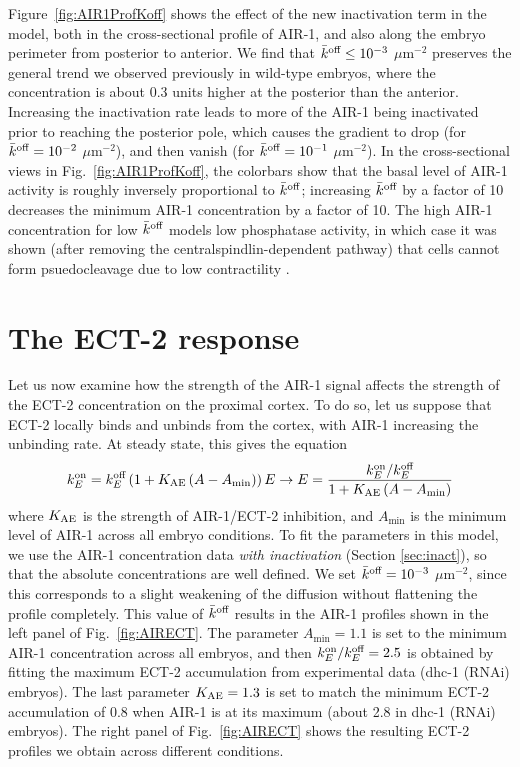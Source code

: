 \documentclass[11pt]{article}
\begin{document}
Figure\ \ref{fig:AIR1ProfKoff} shows the effect of the new inactivation term in the model, both in the cross-sectional profile of AIR-1, and also along the embryo perimeter from posterior to anterior. We find that $\bar{k}^\text{off} \leq 10^{-3}$ $\mu$m$^{-2}$ preserves the general trend we observed previously in wild-type embryos, where the concentration is about 0.3 units higher at the posterior than the anterior. Increasing the inactivation rate leads to more of the AIR-1 being inactivated prior to reaching the posterior pole, which causes the gradient to drop (for $\bar{k}^\text{off}=10^{-2}$ $\mu$m$^{-2}$), and then vanish (for $\bar{k}^\text{off}=10^{-1}$ $\mu$m$^{-2}$). In the cross-sectional views in Fig.\ \ref{fig:AIR1ProfKoff}, the colorbars show that the basal level of AIR-1 activity is roughly inversely proportional to $\bar{k}^\text{off}$; increasing $\bar{k}^\text{off}$ by a factor of 10 decreases the minimum AIR-1 concentration by a factor of 10. The high AIR-1 concentration for low $\bar{k}^\text{off}$ models low phosphatase activity, in which case it was shown (after removing the centralspindlin-dependent pathway) that cells cannot form psuedocleavage due to low contractility \cite{afshar2010regulation, kotak2016aurora}. 

\section{The ECT-2 response}
Let us now examine how the strength of the AIR-1 signal affects the strength of the ECT-2 concentration on the proximal cortex. To do so, let us suppose that ECT-2 locally binds and unbinds from the cortex, with AIR-1 increasing the unbinding rate. At steady state, this gives the equation
\begin{equation}
\label{eq:EctA}
 k^\text{on}_E = k^\text{off}_E \left(1+K_\text{AE} \left(A-A_\text{min}\right)\right)E \rightarrow E = \frac{k^\text{on}_E/ k^\text{off}_E}{ 1+K_\text{AE} \left(A-A_\text{min}\right)}
\end{equation}
where $K_\text{AE}$ is the strength of AIR-1/ECT-2 inhibition, and $A_\text{min}$ is the minimum level of AIR-1 across all embryo conditions. To fit the parameters in this model, we use the AIR-1 concentration data \emph{with inactivation} (Section \ref{sec:inact}), so that the absolute concentrations are well defined. We set $\bar{k}^\text{off}=10^{-3}$ $\mu$m$^{-2}$, since this corresponds to a slight weakening of the diffusion without flattening the profile completely. This value of $\bar{k}^\text{off}$ results in the AIR-1 profiles shown in the left panel of Fig.\ \ref{fig:AIRECT}. The parameter $A_\text{min}=1.1$ is set to the minimum AIR-1 concentration across all embryos, and then $k^\text{on}_E/ k^\text{off}_E=2.5$ is obtained by fitting the maximum ECT-2 accumulation from experimental data (dhc-1 (RNAi) embryos). The last parameter $K_\text{AE}=1.3$ is set to match the minimum ECT-2 accumulation of 0.8 when AIR-1 is at its maximum (about 2.8 in dhc-1 (RNAi) embryos). The right panel of Fig.\ \ref{fig:AIRECT} shows the resulting ECT-2 profiles we obtain across different conditions. 
\end{document}
